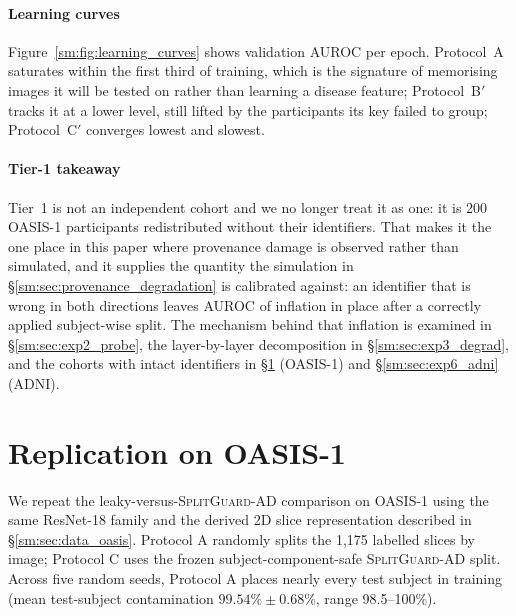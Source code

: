 \documentclass[11pt]{article}
\newcommand{\SGA}{\textsc{SplitGuard-AD}}
\begin{document}
\paragraph{Learning curves}
Figure~\ref{sm:fig:learning_curves} shows validation AUROC per epoch.
Protocol~A saturates within the first third of training, which is the
signature of memorising images it will be tested on rather than learning
a disease feature; Protocol~B$'$ tracks it at a lower level, still
lifted by the participants its key failed to group; Protocol~C$'$
converges lowest and slowest.



\paragraph{Tier-1 takeaway}
Tier~1 is not an independent cohort and we no longer treat it as one: it
is $200$ OASIS-1 participants redistributed without their identifiers.
That makes it the one place in this paper where provenance damage is
observed rather than simulated, and it supplies the quantity the
simulation in \S\ref{sm:sec:provenance_degradation} is calibrated against:
an identifier that is wrong in both directions leaves
\TierOneGapResidual{} AUROC of inflation in place after a correctly
applied subject-wise split. The mechanism behind that inflation is
examined in \S\ref{sm:sec:exp2_probe}, the layer-by-layer decomposition in
\S\ref{sm:sec:exp3_degrad}, and the cohorts with intact identifiers in
\S\ref{sm:sec:exp5_oasis} (OASIS-1) and \S\ref{sm:sec:exp6_adni} (ADNI).



\section{Replication on OASIS-1}
\label{sm:sec:exp5_oasis}

We repeat the leaky-versus-\SGA{} comparison on OASIS-1 using the same
ResNet-18 family and the derived 2D slice representation described in
\S\ref{sm:sec:data_oasis}.
Protocol A randomly splits the 1,175 labelled slices by image; Protocol C
uses the frozen subject-component-safe \SGA{} split.
Across five random seeds, Protocol A places nearly every test subject in
training (mean test-subject contamination
\(99.54\% \pm 0.68\%\), range 98.5--100\%).
\end{document}
